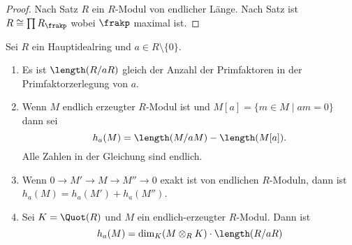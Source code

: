 \begin{proof}
	Nach Satz   \(R\) ein \(R\)-Modul von endlicher Länge. Nach Satz  ist \(R\cong \prod R_\frakp\) wobei \(\frakp\) maximal ist.
\end{proof}
\begin{Lemma}
	Sei \(R\) ein Hauptidealring und \(a\in R\setminus\{0\}\).
	\begin{enumerate}
		\item Es ist \(\length(R/aR)\) gleich der Anzahl der Primfaktoren in der Primfaktorzerlegung von \(a\).
		\item Wenn \(M\) endlich erzeugter \(R\)-Modul ist und \(M[a]=\{m\in M\mid am=0\}\) dann sei \[h_a(M)=\length(M/aM)-\length(M[a]).\] Alle Zahlen in der Gleichung sind endlich.
		\item Wenn \(0\to M'\to M\to M''\to 0\) exakt ist von endlichen \(R\)-Moduln, dann ist \(h_a(M)=h_a(M')+h_a(M'')\).
		\item Sei \(K=\Quot(R)\) und \(M\) ein endlich-erzeugter \(R\)-Modul. Dann ist 
		\[h_a(M)=\dim_K(M\otimes_RK)\cdot\length(R/aR)\]
	\end{enumerate}
\end{Lemma}
